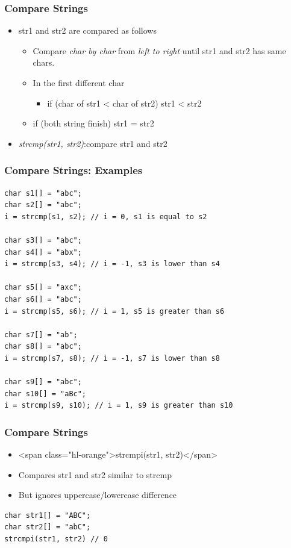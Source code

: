 \documentclass{../c-lecture}
\begin{document}
\begin{frame}
  \frametitle{Compare Strings}
  \begin{itemize}
    \item str1 and str2 are compared as follows
    \begin{itemize}
      \item
        Compare \textit{\color{LimeGreen} char by char} from
        \textit{\color{Cyan} left to right} until str1 and str2 has same
        chars.

      \item In the first different char
      \begin{itemize}
        \item if (char of str1 < char of str2) \textrightarrow str1 < str2
      \end{itemize}
      \item if (both string finish) \textrightarrow str1 = str2
    \end{itemize}
    \item
      \textit{\color{YellowOrange} strcmp(str1, str2)}:compare str1 and str2
  \end{itemize}
\end{frame}

\begin{frame}[fragile]
  \frametitle{Compare Strings: Examples}
  \begin{verbatim}
char s1[] = "abc";
char s2[] = "abc";
i = strcmp(s1, s2); // i = 0, s1 is equal to s2

char s3[] = "abc";
char s4[] = "abx";
i = strcmp(s3, s4); // i = -1, s3 is lower than s4

char s5[] = "axc";
char s6[] = "abc";
i = strcmp(s5, s6); // i = 1, s5 is greater than s6

char s7[] = "ab";
char s8[] = "abc";
i = strcmp(s7, s8); // i = -1, s7 is lower than s8

char s9[] = "abc";
char s10[] = "aBc";
i = strcmp(s9, s10); // i = 1, s9 is greater than s10
  \end{verbatim}
\end{frame}

\begin{frame}[fragile]
  \frametitle{Compare Strings}
  \begin{itemize}
    \item <span class="hl-orange">strcmpi(str1, str2)</span>
    \item Compares str1 and str2 similar to strcmp
    \item But ignores uppercase/lowercase difference
  \end{itemize}
  \begin{verbatim}
char str1[] = "ABC";
char str2[] = "abC";
strcmpi(str1, str2) // 0
  \end{verbatim}
\end{frame}
\end{document}
